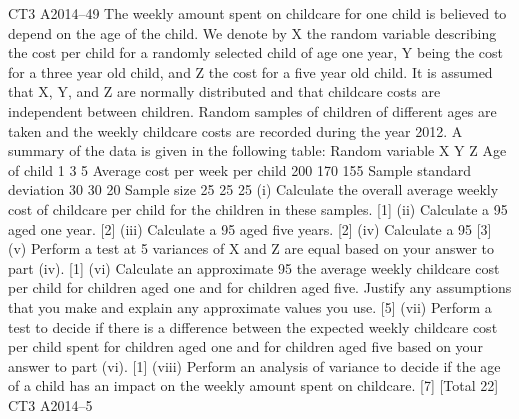 CT3 A2014–49
The weekly amount spent on childcare for one child is believed to depend on the age
of the child. We denote by X the random variable describing the cost per child for a
randomly selected child of age one year, Y being the cost for a three year old child,
and Z the cost for a five year old child. It is assumed that X, Y, and Z are normally
distributed and that childcare costs are independent between children. Random
samples of children of different ages are taken and the weekly childcare costs are
recorded during the year 2012. A summary of the data is given in the following table:
Random variable
X
Y
Z
Age of child
1
3
5
Average cost per week per child 200 170 155
Sample standard deviation
30 30 20
Sample size
25 25 25
(i)
Calculate the overall average weekly cost of childcare per child for the
children in these samples.
[1]
(ii) Calculate a 95%
aged one year.
[2]
(iii) Calculate a 95%
aged five years.
[2]
(iv) Calculate a 95%
[3]
(v) Perform a test at 5%
variances of X and Z are equal based on your answer to part (iv).
[1]
(vi) Calculate an approximate 95%
the average weekly childcare cost per child for children aged one and for
children aged five. Justify any assumptions that you make and explain any
approximate values you use.
[5]
(vii) Perform a test to decide if there is a difference between the expected weekly
childcare cost per child spent for children aged one and for children aged five
based on your answer to part (vi).
[1]
(viii) Perform an analysis of variance to decide if the age of a child has an impact on
the weekly amount spent on childcare.
[7]
[Total 22]
CT3 A2014–5

